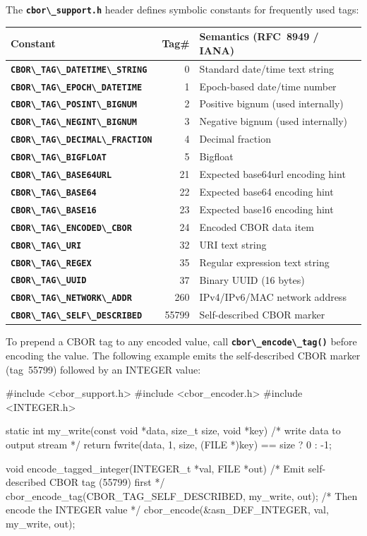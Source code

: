 \documentclass[english,oneside,12pt]{book}
\newcommand{\code}[1]{\texttt{\textbf{\lstinline{#1}}}}
\begin{document}
The \code{cbor\_support.h} header defines symbolic constants for frequently
used tags:

\begin{tabular}[h!]{lrl}
\textbf{Constant} & \textbf{Tag\#} & \textbf{Semantics (RFC~8949 / IANA)} \\
\hline
\code{CBOR\_TAG\_DATETIME\_STRING}  & 0     & Standard date/time text string \\
\code{CBOR\_TAG\_EPOCH\_DATETIME}   & 1     & Epoch-based date/time number \\
\code{CBOR\_TAG\_POSINT\_BIGNUM}    & 2     & Positive bignum (used internally) \\
\code{CBOR\_TAG\_NEGINT\_BIGNUM}    & 3     & Negative bignum (used internally) \\
\code{CBOR\_TAG\_DECIMAL\_FRACTION} & 4     & Decimal fraction \\
\code{CBOR\_TAG\_BIGFLOAT}          & 5     & Bigfloat \\
\code{CBOR\_TAG\_BASE64URL}         & 21    & Expected base64url encoding hint \\
\code{CBOR\_TAG\_BASE64}            & 22    & Expected base64 encoding hint \\
\code{CBOR\_TAG\_BASE16}            & 23    & Expected base16 encoding hint \\
\code{CBOR\_TAG\_ENCODED\_CBOR}     & 24    & Encoded CBOR data item \\
\code{CBOR\_TAG\_URI}               & 32    & URI text string \\
\code{CBOR\_TAG\_REGEX}             & 35    & Regular expression text string \\
\code{CBOR\_TAG\_UUID}              & 37    & Binary UUID (16 bytes) \\
\code{CBOR\_TAG\_NETWORK\_ADDR}     & 260   & IPv4/IPv6/MAC network address \\
\code{CBOR\_TAG\_SELF\_DESCRIBED}   & 55799 & Self-described CBOR marker \\
\end{tabular}

To prepend a CBOR tag to any encoded value, call \code{cbor\_encode\_tag()}
before encoding the value.  The following example emits the self-described
CBOR marker (tag~55799) followed by an INTEGER value:

\begin{codesample}
#include <cbor_support.h>
#include <cbor_encoder.h>
#include <INTEGER.h>

static int my_write(const void *data, size_t size, void *key) {
    /* write data to output stream */
    return fwrite(data, 1, size, (FILE *)key) == size ? 0 : -1;
}

void encode_tagged_integer(INTEGER_t *val, FILE *out) {
    /* Emit self-described CBOR tag (55799) first */
    cbor_encode_tag(CBOR_TAG_SELF_DESCRIBED, my_write, out);
    /* Then encode the INTEGER value */
    cbor_encode(&asn_DEF_INTEGER, val, my_write, out);
}
\end{codesample}
\end{document}
